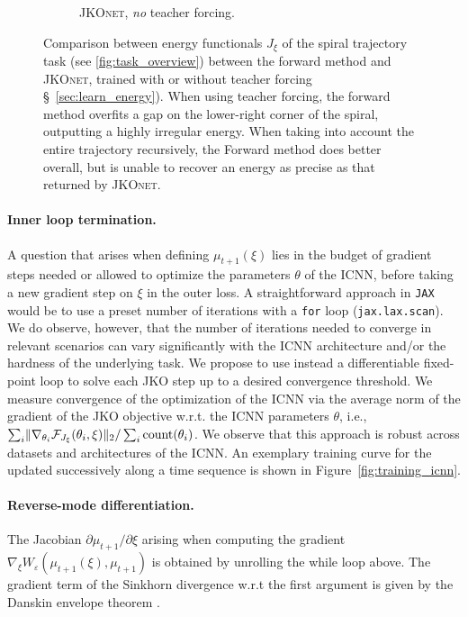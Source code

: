 \begin{figure}[t]
\begin{subfigure}[t]{0.24\textwidth}
         \caption{\textsc{JKOnet}, \protect\newline \emph{no} teacher forcing.}
     \end{subfigure}
	 \caption{Comparison between energy functionals $J_\xi$ of the spiral trajectory task (see \ref{fig:task_overview}) between the forward method and \textsc{JKOnet}, trained with or without teacher forcing \S~\ref{sec:learn_energy}). When using teacher forcing, the forward method overfits a gap on the lower-right corner of the spiral, outputting a highly irregular energy. When taking into account the entire trajectory recursively, the Forward method does better overall, but is unable to recover an energy as precise as that returned by \textsc{JKOnet}.}
	 \label{fig:exp_comp_spiral}
\end{figure}


\paragraph{Inner loop termination.} A question that arises when defining $\mu_{t+1}(\xi)$ lies in the budget of gradient steps needed or allowed to optimize the parameters $\theta$ of the ICNN, before taking a new gradient step on $\xi$ in the outer loss. A straightforward approach in \texttt{JAX} \citep{jax2018github} would be to use a preset number of iterations with a \texttt{for} loop (\texttt{jax.lax.scan}). 
We do observe, however, that the number of iterations needed to converge in relevant scenarios can vary significantly with the ICNN architecture and/or the hardness of the underlying task.
We propose to use instead a differentiable fixed-point loop to solve each \acrshort{JKO} step up to a desired convergence threshold.
We measure convergence of the optimization of the ICNN via the average norm of the gradient of the \acrshort{JKO} objective w.r.t. the ICNN parameters $\theta$, i.e., $\sum_i \lVert\nabla_{\theta_i}\mathcal{F}_{J_\xi}(\theta_i, \xi)\rVert_2/\sum_i \text{count}(\theta_i)$.
We observe that this approach is robust across datasets and architectures of the ICNN. An exemplary training curve for the  updated successively along a time sequence is shown in Figure~\ref{fig:training_icnn}.

\paragraph{Reverse-mode differentiation.} The Jacobian $\partial \mu_{t+1} / \partial\xi$ arising when computing the gradient $\nabla_\xi W_\varepsilon(\mu_{t+1}(\xi), \mu_{t+1})$ is obtained by unrolling the while loop above. The gradient term of the Sinkhorn divergence w.r.t the first argument is given by the Danskin envelope theorem \citep{danskin2012theory}.

